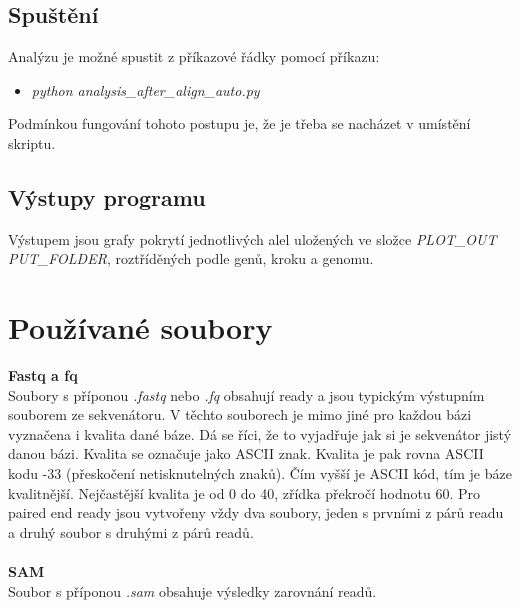 \documentclass[czech,DP]{thesiskiv}
\numberwithin{equation}{section}
\begin{document}
\subsection{Spuštění}
Analýzu je možné spustit z příkazové řádky pomocí příkazu:
\begin{itemize}
 \item \colorbox{gray!15}{\textit{python analysis\_after\_align\_auto.py}}
\end{itemize}
\noindent
Podmínkou fungování tohoto postupu je, že je třeba se nacházet v umístění skriptu. 

\subsection{Výstupy programu}
Výstupem jsou grafy pokrytí jednotlivých alel uložených ve složce \textit{PLOT\_OUT\\PUT\_FOLDER}, roztříděných podle genů, kroku a genomu.





\section{Používané soubory}

\textbf{Fastq a fq}
\\
\noindent
Soubory s příponou \textit{.fastq} nebo \textit{.fq} obsahují ready a jsou typickým výstupním souborem ze sekvenátoru. V těchto souborech je mimo jiné pro každou bázi vyznačena i kvalita dané báze. Dá se říci, že to vyjadřuje jak si je sekvenátor jistý danou bázi. Kvalita se označuje jako ASCII znak. Kvalita je pak rovna ASCII kodu -33 (přeskočení netisknutelných znaků). Čím vyšší je ASCII kód, tím je báze kvalitnější. Nejčastější kvalita je od 0 do 40, zřídka překročí hodnotu 60. Pro paired end ready jsou vytvořeny vždy dva soubory, jeden s prvními z párů readu a druhý soubor s druhými z párů readů. 
\\
\\
\textbf{SAM}	   
\\
\noindent 
Soubor s příponou \textit{.sam} obsahuje výsledky zarovnání readů.
\end{document}
